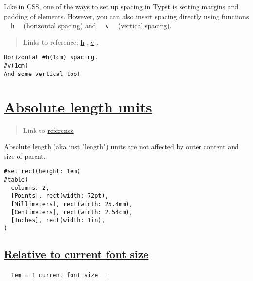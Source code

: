 Like in CSS, one of the ways to set up spacing in Typst is setting
margins and padding of elements. However, you can also insert spacing
directly using functions \texttt{\ }{\texttt{\ h\ }}\texttt{\ }
(horizontal spacing) and \texttt{\ }{\texttt{\ v\ }}\texttt{\ }
(vertical spacing).

\begin{quote}
Links to reference: \href{https://typst.app/docs/reference/layout/h/}{h}
, \href{https://typst.app/docs/reference/layout/v/}{v} .
\end{quote}

\begin{verbatim}
Horizontal #h(1cm) spacing.
#v(1cm)
And some vertical too!
\end{verbatim}

\pandocbounded{}

\section{\texorpdfstring{\hyperref[absolute-length-units]{Absolute
length units}}{Absolute length units}}\label{absolute-length-units}

\begin{quote}
Link to
\href{https://typst.app/docs/reference/layout/length/}{reference}
\end{quote}

Absolute length (aka just "length") units are not affected by outer
content and size of parent.

\begin{verbatim}
#set rect(height: 1em)
#table(
  columns: 2,
  [Points], rect(width: 72pt),
  [Millimeters], rect(width: 25.4mm),
  [Centimeters], rect(width: 2.54cm),
  [Inches], rect(width: 1in),
)
\end{verbatim}

\pandocbounded{}

\subsection{\texorpdfstring{\hyperref[relative-to-current-font-size]{Relative
to current font
size}}{Relative to current font size}}\label{relative-to-current-font-size}

\texttt{\ }{\texttt{\ 1em\ =\ 1\ current\ font\ size\ }}\texttt{\ } :


